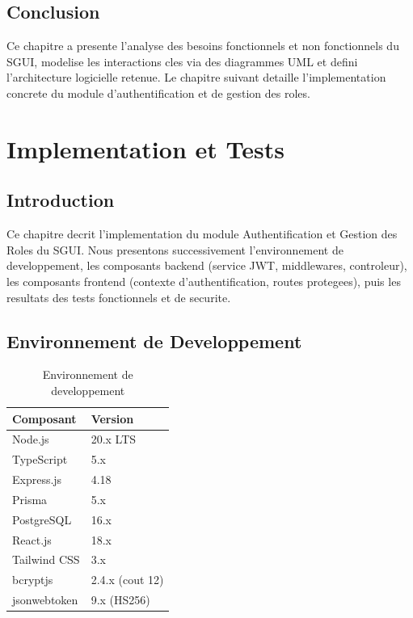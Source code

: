 \documentclass[12pt,a4paper]{report}
\begin{document}
\section{Conclusion}

Ce chapitre a presente l'analyse des besoins fonctionnels et non
fonctionnels du SGUI, modelise les interactions cles via des diagrammes
UML et defini l'architecture logicielle retenue. Le chapitre suivant
detaille l'implementation concrete du module d'authentification et de
gestion des roles.

\chapter{Implementation et Tests}

\section{Introduction}

Ce chapitre decrit l'implementation du module Authentification et
Gestion des Roles du SGUI. Nous presentons successivement
l'environnement de developpement, les composants backend (service JWT,
middlewares, controleur), les composants frontend (contexte
d'authentification, routes protegees), puis les resultats des tests
fonctionnels et de securite.

\section{Environnement de Developpement}

\begin{table}[H]
\centering
\caption{Environnement de developpement}
\begin{tabular}{ll}
\toprule
\textbf{Composant} & \textbf{Version} \\
\midrule
Node.js              & 20.x LTS \\
TypeScript           & 5.x \\
Express.js           & 4.18 \\
Prisma               & 5.x \\
PostgreSQL           & 16.x \\
React.js             & 18.x \\
Tailwind CSS         & 3.x \\
bcryptjs             & 2.4.x (cout 12) \\
jsonwebtoken         & 9.x (HS256) \\
\bottomrule
\end{tabular}
\end{table}
\end{document}
